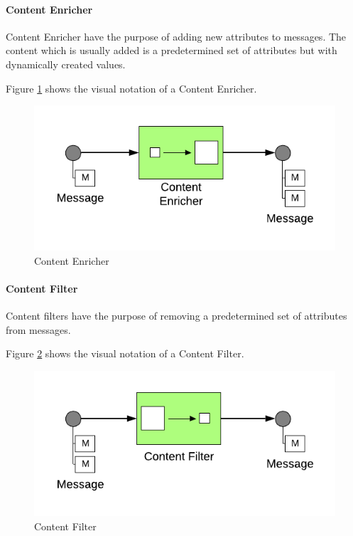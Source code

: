 \paragraph{Content Enricher}

Content Enricher have the purpose of adding new attributes to messages. The content which is usually added is a predetermined set of attributes but with dynamically created values.

Figure \ref{messaging:enricher} shows the visual notation of a Content Enricher.


\begin{figure}[H]
    \centering
    \includegraphics[scale=0.6]{Diagrams/Messaging/10. Content Enricher.pdf}
    \caption{Content Enricher}
    \label{messaging:enricher}
\end{figure}

\paragraph{Content Filter}

Content filters have the purpose of removing a predetermined set of attributes from messages.

Figure \ref{messaging:filter3} shows the visual notation of a Content Filter.

\begin{figure}[H]
    \centering
    \includegraphics[scale=0.6]{Diagrams/Messaging/11. Content Filter.pdf}
    \caption{Content Filter}
    \label{messaging:filter3}
\end{figure}

